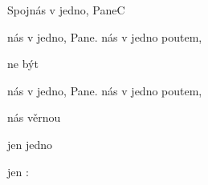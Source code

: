 \setcounter{page}{116}
\begin{song}{Spojnás v jedno, Pane}{C}{}
\begin{SBChorus*}
 nás v jedno, Pane.  nás v jedno poutem, 

 ne být  

 nás v jedno, Pane.   nás v jedno poutem, 

 nás věrnou   

 jen    jedno  

 jen    :
\end{SBChorus*}
\end{song}
\pagebreak

